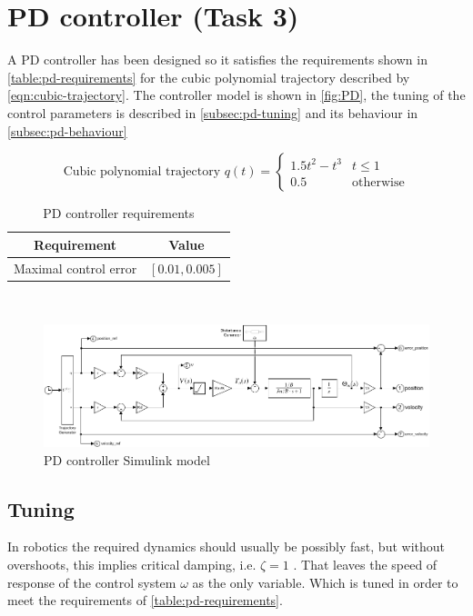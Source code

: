 \section{PD controller (Task 3)}
\label{sec:pd}

A PD controller has been designed so it satisfies the requirements shown in
\autoref{table:pd-requirements} for the cubic polynomial trajectory
\cite{TrajGener} described by \autoref{eqn:cubic-trajectory}. The controller
model is shown in \autoref{fig:PD}, the tuning of the control parameters is
described in \autoref{subsec:pd-tuning} and its behaviour in
\autoref{subsec:pd-behaviour}

\begin{equation}
    \text{Cubic polynomial trajectory } q(t) = 
    \begin{cases}
        1.5 t^2 - t^3 & t \leq 1 \\
        0.5 & \text{otherwise}
    \end{cases}
    \label{eqn:cubic-trajectory}
\end{equation}

\begin{table}
    \centering
    \begin{tabular}{c | c}
        Requirement & Value \\ \hline
        Maximal control error & $[0.01, 0.005]$
    \end{tabular}
    \\ [1ex]
    \caption{PD controller requirements}
    \label{table:pd-requirements}
\end{table}

\begin{figure}
    \includegraphics[width=\textwidth]{PD.slx.png}
    \caption{PD controller Simulink model}
    \label{fig:PD}
\end{figure}

\subsection{Tuning}
\label{subsec:pd-tuning}
In robotics the required dynamics should usually be possibly fast, but without
overshoots, this implies critical damping, i.e. $\zeta = 1$ \cite{SingleLink}.
That leaves the speed of response of the control system $\omega$ as the only
variable. Which is tuned in order to meet the requirements of
\autoref{table:pd-requirements}.

